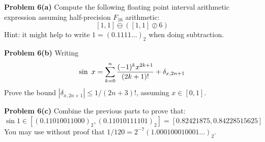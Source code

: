 \documentclass[12pt,a4paper]{article}
\begin{document}
\textbf{Problem 6(a)} Compute the following floating point interval arithmetic expression assuming half-precision $F_{16}$ arithmetic:
\[
[1,1] \ensuremath{\ominus} ([1,1] \ensuremath{\oslash} 6)
\]
Hint: it might help to write $1 = (0.1111\ensuremath{\ldots})_2$ when doing subtraction.

\textbf{Problem 6(b)} Writing 
\[
\sin\ x = \ensuremath{\sum}_{k=0}^n {(-1)^k x^{2k+1} \over (2k+1)!} + \ensuremath{\delta}_{x,2n+1}
\]
Prove the bound $|\ensuremath{\delta}_{x,2n+1}| \ensuremath{\leq} 1/(2n+3)!$, assuming $x \ensuremath{\in} [0,1]$.

\textbf{Problem 6(c)} Combine the previous parts to prove that:
\[
\sin 1 \ensuremath{\in} [(0.11010011000)_2, (0.11010111101)_2] = [0.82421875, 0.84228515625]
\]
You may use without proof that $1/120 = 2^{-7} (1.000100010001\ensuremath{\ldots})_2$. 
\end{document}

